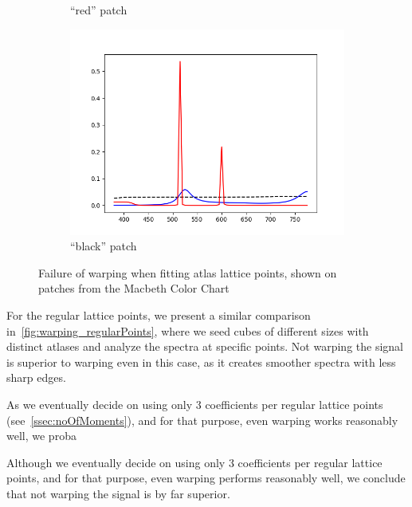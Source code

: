 \begin{figure}[t]
\begin{subfigure}[t]{0.32\textwidth}
	\caption{``red'' patch}
	\label{fig:warping_alp_red}
	\end{subfigure} \hspace{0.1em}
	\begin{subfigure}[t]{0.32\textwidth}
		\includegraphics[width=\linewidth]{img/results_warping_black.png}
		\caption{``black'' patch}
		\label{fig:warping_alp_black}
	\end{subfigure}
	\caption{Failure of warping when fitting atlas lattice points, shown on patches from the Macbeth Color Chart}
	\label{fig:warping_atlasLatticePoints}
\end{figure}

For the regular lattice points, we present a similar comparison in~\cref{fig:warping_regularPoints}, where we seed cubes of different sizes with distinct atlases and analyze the spectra at specific points. Not warping the signal is superior to warping even in this case, as it creates smoother spectra with less sharp edges. 

As we eventually decide on using only 3 coefficients per regular lattice points (see~\cref{ssec:noOfMoments}), and for that purpose, even warping works reasonably well, we proba

Although we eventually decide on using only 3 coefficients per regular lattice points, and for that purpose, even warping performs reasonably well, we conclude that not warping the signal is by far superior.

